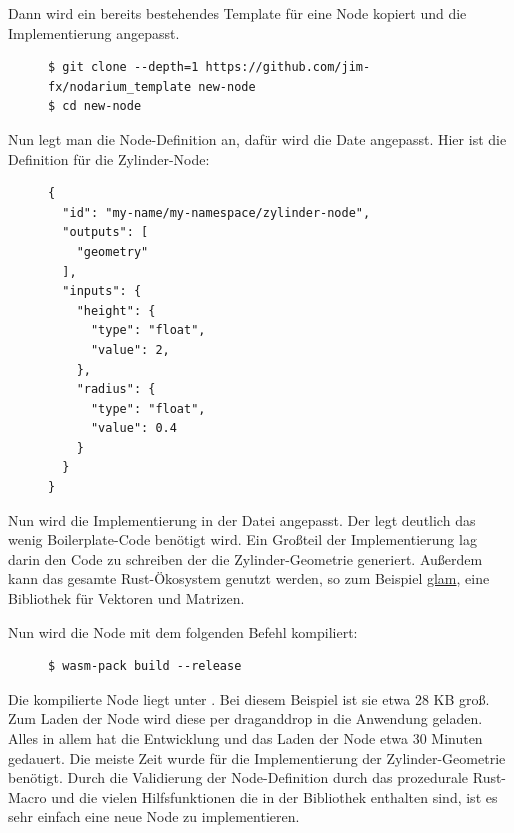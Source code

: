 \documentclass[ngerman]{article}
\begin{document}
Dann wird ein bereits bestehendes Template für eine Node kopiert und die Implementierung angepasst. 

\begin{figure}[htbp]
  \begin{code}
    \begin{verbatim}
$ git clone --depth=1 https://github.com/jim-fx/nodarium_template new-node
$ cd new-node
    \end{verbatim}
  \end{code}
\end{figure}


Nun legt man die Node-Definition an, dafür wird die Date  angepasst. Hier ist die Definition für die Zylinder-Node:


\begin{figure}[htbp]
  \begin{code}
    \begin{verbatim}
{
  "id": "my-name/my-namespace/zylinder-node",
  "outputs": [
    "geometry"
  ],
  "inputs": {
    "height": {
      "type": "float",
      "value": 2,
    },
    "radius": {
      "type": "float",
      "value": 0.4
    }
  }
}
    \end{verbatim}
  \end{code}
\end{figure}

Nun wird die Implementierung in der Datei  angepasst. Der  legt deutlich das wenig Boilerplate-Code benötigt wird. Ein Großteil der Implementierung lag darin den Code zu schreiben der die Zylinder-Geometrie generiert.  Außerdem kann das gesamte Rust-Ökosystem genutzt werden, so zum Beispiel \href{https://docs.rs/glam/latest/glam}{glam}, eine Bibliothek für Vektoren und Matrizen.

\pagebreak

Nun wird die Node mit dem folgenden Befehl kompiliert:

\begin{figure}[htbp]
  \begin{code}
    \begin{verbatim}
$ wasm-pack build --release
    \end{verbatim}
  \end{code}
\end{figure}

Die kompilierte Node liegt unter . Bei diesem Beispiel ist sie etwa 28 KB groß. Zum Laden der Node wird diese per drag\-and\-drop in die Anwendung geladen. 
\br
Alles in allem hat die Entwicklung und das Laden der Node etwa 30 Minuten gedauert. Die meiste Zeit wurde für die Implementierung der Zylinder-Geometrie benötigt. 
Durch die Validierung der Node-Definition durch das prozedurale  Rust-Macro und die vielen Hilfsfunktionen die in der  Bibliothek enthalten sind, ist es sehr einfach eine neue Node zu implementieren.
\end{document}

